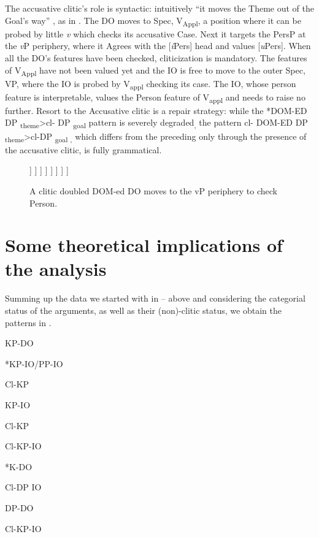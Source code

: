 \documentclass[output=paper,colorlinks,citecolor=brown,nonflat]{langsci/langscibook}
\begin{document}
The accusative clitic’s role is syntactic: intuitively “it moves the Theme out of the Goal’s way” \citep{Anagnostopoulou2006}, as in . The DO moves to Spec, V\textsubscript{Appl}, a position where it can be probed by little \textit{v} which checks its accusative Case. Next it targets the PersP at the \textit{v}P periphery, where it Agrees with the [\textit{i}Pers] head and values [\textit{u}Pers]. When all the DO’s features have been checked, cliticization is mandatory. The features of V\textsubscript{Appl} have not been valued yet and the IO is free to move to the outer Spec, VP, where the IO is probed by V\textsubscript{appl} checking its case. The IO, whose person feature is interpretable, values the Person feature of V\textsubscript{appl} and needs to raise no further. Resort to the Accusative clitic is a repair strategy: while the *DOM-ED DP \textsubscript{theme}>{cl}{}- DP \textsubscript{goal} pattern is severely degraded\textsubscript{,} the pattern {cl}{}- DOM-ED DP \textsubscript{theme}>{cl}{}-DP \textsubscript{goal ,} which differs from the preceding only through the presence of the accusative clitic, is fully grammatical.

\begin{figure}%
	\begin{forest}
		[PersP
			[Pers
			]
			[\textit{v}P
				[KP\textsubscript{Theme}
				]
				[\textit{v}P
					[DP\textsubscript{Agent}
					]
					[\textit{v}'
						[\textit{v}
						]
						[V\textsubscript{Appl}P
								[KP\textsubscript{Theme}
								]
								[V'\textsubscript{Appl}
									[V\textsubscript{Appl}
									]
									[VP
										[KP\textsubscript{Goal}
										]
									]
								]
						]
						]
					]
				]
			]
		]
	\end{forest}
	\caption{\label{fig:cornilescu:13} A clitic doubled DOM-ed DO moves to the vP periphery to check Person.}
\end{figure}


\section{Some theoretical implications of the analysis}\label{sec:cornilescu:6} %

Summing up the data we started with in  –  above and considering the categorial status of the arguments, as well as their (non)-clitic status, we obtain the patterns in .

\ea%
   \label{ex:cornilescu:35}
   \ea\parbox{1.5cm}{KP-DO} *KP-IO/PP-IO \label{ex:cornilescu:35a}
   \ex\parbox{1.5cm}{Cl-KP}     KP-IO \label{ex:cornilescu:35b}
   \ex\parbox{1.5cm}{Cl-KP}  Cl-KP-IO \label{ex:cornilescu:35c}
   \ex\parbox{1.5cm}{*K-DO} Cl-DP IO \label{ex:cornilescu:35d}
   \ex\parbox{1.5cm}{DP-DO} Cl-KP-IO \label{ex:cornilescu:35e}
   \z
   \z
\end{document}
